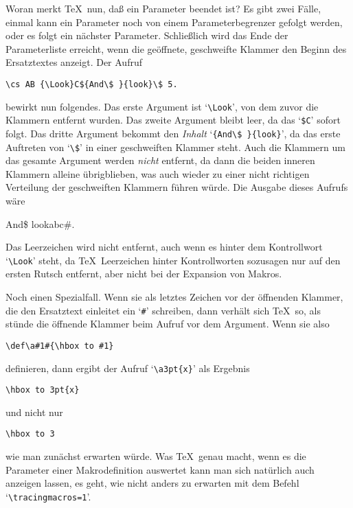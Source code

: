 Woran merkt \TeX\ nun, da\ss{} ein Parameter beendet ist? Es gibt zwei
F\"alle, einmal kann ein Parameter noch von einem 
Parameterbegrenzer
gefolgt werden, oder es folgt ein n\"achster Parameter. Schlie\ss{}lich wird
das Ende der Parameterliste erreicht, wenn die ge\"offnete, geschweifte
Klammer den Beginn des
Ersatztextes anzeigt. Der Aufruf
\begin{verbatim}
\cs AB {\Look}C${And\$ }{look}\$ 5.
\end{verbatim}
bewirkt nun folgendes. Das erste 
Argument ist `\verb|\Look|', von dem
zuvor die Klammern entfernt wurden. Das zweite Argument bleibt
leer,
da das `\verb|$C|' sofort folgt. Das dritte Argument bekommt den {\em
Inhalt} `\verb|{And\$ }{look}|', da das erste Auftreten von `\verb|\$|'
in einer geschweiften Klammer steht. Auch die Klammern um das gesamte
Argument werden {\em nicht} entfernt, da dann die beiden inneren
Klammern alleine \"ubrigblieben, was auch wieder zu einer nicht
richtigen Verteilung der geschweiften Klammern f\"uhren w\"urde. Die
Ausgabe dieses Aufrufs w\"are
\begin{verbatim*}
{And\$ }{look}{ab\Look}\Look c#.
\end{verbatim*}
Das 
Leerzeichen wird nicht entfernt, auch wenn es hinter dem
Kontrollwort `\verb|\Look|' steht, da \TeX\ Leerzeichen hinter
Kontrollworten sozusagen nur auf den ersten Rutsch entfernt, aber
nicht bei der Expansion von Makros.

Noch einen Spezialfall. Wenn sie als letztes Zeichen vor der \"offnenden
Klammer, die den 
Ersatztext einleitet ein `\verb|#|' schreiben, dann
verh\"alt sich \TeX\ so, als st\"unde die \"offnende Klammer beim Aufruf vor
dem Argument. Wenn sie also
\begin{verbatim}
\def\a#1#{\hbox to #1}
\end{verbatim}
definieren, dann ergibt der Aufruf `\verb|\a3pt{x}|' als Ergebnis
\begin{verbatim}
\hbox to 3pt{x}
\end{verbatim}
und nicht nur
\begin{verbatim}
\hbox to 3
\end{verbatim}
wie man zun\"achst erwarten w\"urde. Was \TeX\ genau macht, wenn es die
Parameter einer Makrodefinition auswertet kann man sich nat\"urlich auch
anzeigen lassen, es geht, wie nicht anders zu erwarten mit dem Befehl
`\verb|\tracingmacros=1|'.

